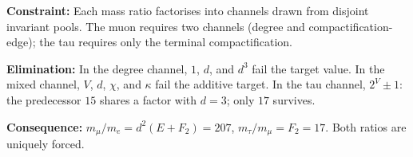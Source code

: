 \documentclass[11pt,a4paper]{book}
\begin{document}
\textbf{Constraint:}
Each mass ratio factorises into channels drawn from disjoint
invariant pools.  The muon requires two channels (degree and
compactification-edge); the tau requires only the terminal
compactification.

\textbf{Elimination:}
In the degree channel, $1$, $d$, and $d^3$ fail the target value.
In the mixed channel, $V$, $d$, $\chi$, and $\kappa$ fail the
additive target.  In the tau channel, $2^V \pm 1$: the predecessor
$15$ shares a factor with $d = 3$; only $17$ survives.

\textbf{Consequence:}
$m_\mu / m_e = d^2 (E + F_2) = 207$, \;$m_\tau / m_\mu = F_2 = 17$.
Both ratios are uniquely forced.

\begin{code}%
\>[0]\<%
\\
%
\\[\AgdaEmptyExtraSkip]%
\>[0]\<%
\\
\>[0]\AgdaSpace{}%
\AgdaSpace{}%
\AgdaSymbol{:}\AgdaSpace{}%
\AgdaSpace{}%
\<%
\\
\>[0][@{}l@{\AgdaIndent{0}}]%
\>[2]%
\>[17]\AgdaSymbol{:}\AgdaSpace{}%
\<%
\\
%
\>[2]%
\>[17]\AgdaSymbol{:}\AgdaSpace{}%
\<%
\\
%
\>[2]\AgdaSpace{}%
\AgdaSymbol{:}\AgdaSpace{}%
\<%
\\
%
\>[2]\AgdaSpace{}%
\AgdaSymbol{:}\AgdaSpace{}%
\<%
\\
%
\\[\AgdaEmptyExtraSkip]%
\>[0]\AgdaSpace{}%
\AgdaSymbol{:}\AgdaSpace{}%
\AgdaSpace{}%
\AgdaSpace{}%
\<%
\\
\>[0]\AgdaSpace{}%
%
\>[37]\AgdaSymbol{=}\AgdaSpace{}%
\<%
\\
\>[0]\AgdaSpace{}%
%
\>[37]\AgdaSymbol{=}\AgdaSpace{}%

\end{code}
\end{document}
